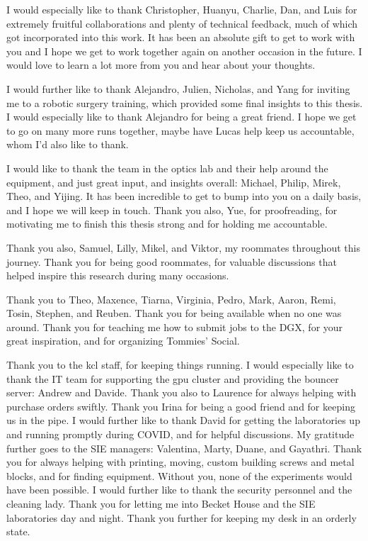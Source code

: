 I would especially like to thank Christopher, Huanyu, Charlie, Dan, and Luis for extremely fruitful collaborations and plenty of technical feedback, much of which got incorporated into this work. It has been an absolute gift to get to work with you and I hope we get to work together again on another occasion in the future. I would love to learn a lot more from you and hear about your thoughts.

I would further like to thank Alejandro, Julien, Nicholas, and Yang for inviting me to a robotic surgery training, which provided some final insights to this thesis. I would especially like to thank Alejandro for being a great friend. I hope we get to go on many more runs together, maybe have Lucas help keep us accountable, whom I'd also like to thank.

I would like to thank the team in the optics lab and their help around the equipment, and just great input, and insights overall: Michael, Philip, Mirek, Theo, and Yijing. It has been incredible to get to bump into you on a daily basis, and I hope we will keep in touch. Thank you also, Yue, for proofreading, for motivating me to finish this thesis strong and for holding me accountable.

Thank you also, Samuel, Lilly, Mikel, and Viktor, my roommates throughout this journey. Thank you for being good roommates, for valuable discussions that helped inspire this research during many occasions.

Thank you to Theo, Maxence, Tiarna, Virginia, Pedro, Mark, Aaron, Remi, Tosin, Stephen, and Reuben. Thank you for being available when no one was around. Thank you for teaching me how to submit jobs to the DGX, for your great inspiration, and for organizing Tommies' Social.

Thank you to the \gls{kcl} staff, for keeping things running. I would especially like to thank the IT team for supporting the \gls{gpu} cluster and providing the bouncer server: Andrew and Davide. Thank you also to Laurence for always helping with purchase orders swiftly. Thank you Irina for being a good friend and for keeping us in the pipe. I would further like to thank David for getting the laboratories up and running promptly during COVID, and for helpful discussions. My gratitude further goes to the SIE managers: Valentina, Marty, Duane, and Gayathri. Thank you for always helping with printing, moving, custom building screws and metal blocks, and for finding equipment. Without you, none of the experiments would have been possible. I would further like to thank the security personnel and the cleaning lady. Thank you for letting me into Becket House and the SIE laboratories day and night. Thank you further for keeping my desk in an orderly state.

